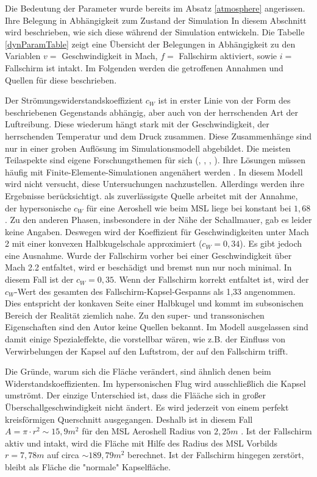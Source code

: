 Die Bedeutung der Parameter wurde bereits im Absatz \ref{atmosphere} angerissen. Ihre Belegung in Abhängigkeit zum Zustand der Simulation In diesem Abschnitt wird beschrieben, wie sich diese während der Simulation entwickeln. Die Tabelle \ref{dynParamTable} zeigt eine Übersicht der Belegungen in Abhängigkeit zu den Variablen $v = $ Geschwindigkeit in Mach, $f =$ Fallschirm aktiviert, sowie $i =$ Fallschirm ist intakt. Im Folgenden werden die getroffenen Annahmen und Quellen für diese beschrieben.



Der Strömungswiderstandskoeffizient $c_W$ ist in erster Linie von der Form des beschriebenen Gegenstands abhängig, aber auch von der herrschenden Art der Luftreibung. Diese wiederum hängt stark mit der Geschwindigkeit, der herrschenden Temperatur und dem Druck zusammen. Diese Zusammenhänge sind nur in einer groben Auflösung im Simulationsmodell abgebildet. Die meisten Teilaspekte sind eigene Forschungsthemen für sich (\cite{Blanchard1980}, \cite{Edquist2009}, \cite{Theisinger2009}, \cite{Yamada2009}). Ihre Lösungen müssen häufig mit Finite-Elemente-Simulationen angenähert werden \cite{Edquist2009}. In diesem Modell wird nicht versucht, diese Untersuchungen nachzustellen. Allerdings werden ihre Ergebnisse berücksichtigt. \cite{Wells2000} als zuverlässigste Quelle arbeitet mit der Annahme, der hypersonische $c_W$ für eine Aeroshell wie beim MSL liege bei konstant bei $1,68$. Zu den anderen Phasen, insbesondere in der Nähe der Schallmauer, gab es leider keine Angaben. Deswegen wird der Koeffizient für Geschwindigkeiten unter Mach 2 mit einer konvexen Halbkugelschale approximiert ($c_W = 0,34$). Es gibt jedoch eine Ausnahme. Wurde der Fallschirm vorher bei einer Geschwindigkeit über Mach 2.2 \cite{Way2007} \cite{Edquist2009} entfaltet, wird er beschädigt und bremst nun nur noch minimal. In diesem Fall ist der $c_W = 0,35$. Wenn der Fallschirm korrekt entfaltet ist, wird der $c_W$-Wert des gesamten des Fallschirm-Kapsel-Gespanns als 1,33 angenommen. Dies entspricht der konkaven Seite einer Halbkugel und kommt im subsonischen Bereich der Realität ziemlich nahe. Zu den super- und transsonischen Eigenschaften sind den Autor keine Quellen bekannt. Im Modell ausgelassen sind damit einige Spezialeffekte, die vorstellbar wären, wie z.B. der Einfluss von Verwirbelungen der Kapsel auf den Luftstrom, der auf den Fallschirm trifft.

Die Gründe, warum sich die Fläche verändert, sind ähnlich denen beim Widerstandskoeffizienten. Im hypersonischen Flug wird ausschließlich die Kapsel umströmt. Der einzige Unterschied ist, dass die Flääche sich in großer Überschallgeschwindigkeit nicht ändert. Es wird jederzeit von einem perfekt kreisförmigen Querschnitt ausgegangen. Deshalb ist in diesem Fall $ A = \pi \cdot r^2 \sim 15,9m^2$ für den MSL Aeroshell Radius von $2,25m$ \cite{Edquist2009}. Ist der Fallschirm aktiv und intakt, wird die Fläche mit Hilfe des Radius des MSL Vorbilds $ r = 7,78m $ \cite{NASA/JPL2009} auf circa $\sim 189,79m^2$ berechnet. Ist der Fallschirm hingegen zerstört, bleibt als Fläche die "normale" Kapselfläche.

